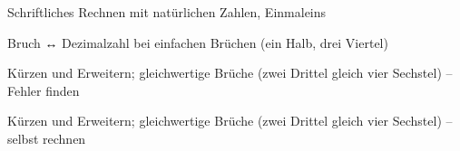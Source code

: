 \begin{aufgabe}{Schriftliches Rechnen mit natürlichen Zahlen, Einmaleins}
\end{aufgabe}

\begin{aufgabe}{Bruch ↔ Dezimalzahl bei einfachen Brüchen (ein Halb, drei Viertel)}
\end{aufgabe}

\begin{aufgabe}{Kürzen und Erweitern; gleichwertige Brüche (zwei Drittel gleich vier Sechstel) – Fehler finden}
\end{aufgabe}

\begin{aufgabe}{Kürzen und Erweitern; gleichwertige Brüche (zwei Drittel gleich vier Sechstel) – selbst rechnen}
\end{aufgabe}
